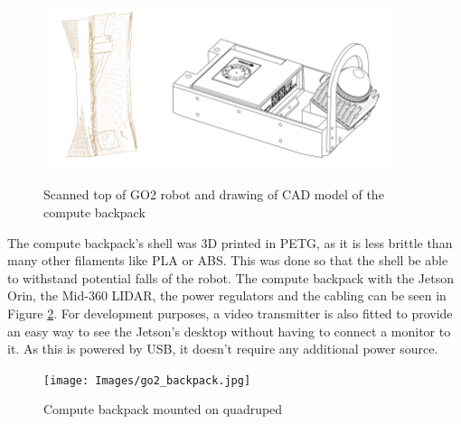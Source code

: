 \documentclass[12pt]{article}
\begin{document}
        \begin{figure}[H]
            \centering
            \includegraphics[width=0.3\textwidth]{Images/ScanGO2Top.pdf}
            \includegraphics[width=0.6\textwidth]{Images/ComputeBackpack.pdf}
            \caption{Scanned top of GO2 robot and drawing of CAD model of the compute backpack }
            \label{fig:scanner_and_cad}
        \end{figure}

        The compute backpack's shell was 3D printed in PETG, as it is less brittle than many other filaments like PLA or ABS. This was done so that the shell be able to withstand potential falls of the robot. The compute backpack with the Jetson Orin, the Mid-360 LIDAR, the power regulators and the cabling can be seen in Figure \ref{fig:compute_backpack}. For development purposes, a video transmitter is also fitted to provide an easy way to see the Jetson's desktop without having to connect a monitor to it. As this is powered by USB, it doesn't require any additional power source.

        \begin{figure}[H]
            \centering
            \texttt{[image: Images/go2\_backpack.jpg]}
            \caption{Compute backpack mounted on quadruped}
            \label{fig:compute_backpack}
        \end{figure}
\end{document}
